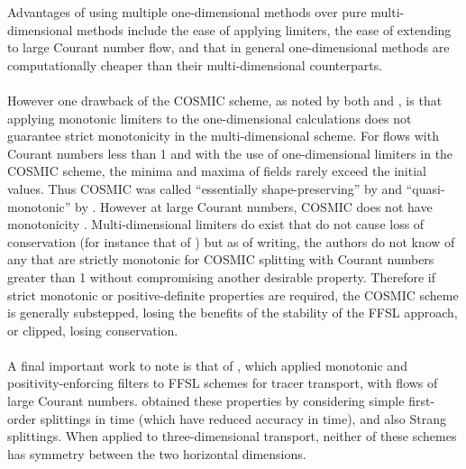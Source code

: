 \documentclass{ametsocV6.1}
\begin{document}
Advantages of using multiple one-dimensional methods over pure multi-dimensional methods include the ease of applying limiters, the ease of extending to large Courant number flow, and that in general one-dimensional methods are computationally cheaper than their multi-dimensional counterparts. \\
\\
However one drawback of the COSMIC scheme, as noted by both \citet{leonard1996cosmic} and \citet{lin1996ffsl},  is that applying monotonic limiters to the one-dimensional calculations does not guarantee strict monotonicity in the multi-dimensional scheme.
For flows with Courant numbers less than 1 and with the use of one-dimensional limiters in the COSMIC scheme, the minima and maxima of fields rarely exceed the initial values.
Thus COSMIC was called ``essentially shape-preserving'' by \citet{leonard1996cosmic} and ``quasi-monotonic'' by \citet{putman2007fvtransport}.
However at large Courant numbers, COSMIC does not have monotonicity \citep{leonard1996cosmic,bott2010improving}.
Multi-dimensional limiters do exist that do not cause loss of conservation (for instance that of \citet{thuburn1996multidimensional}) but as of writing, the authors do not know of any that are strictly monotonic for COSMIC splitting with Courant numbers greater than 1 without compromising another desirable property.
Therefore if strict monotonic or positive-definite properties are required, the COSMIC scheme is generally substepped, losing the benefits of the stability of the FFSL approach, or clipped, losing conservation. \\
\\
A final important work to note is that of \citet{skamarock2006limiters}, which applied monotonic and positivity-enforcing filters to FFSL schemes for tracer transport, with flows of large Courant numbers.
\citet{skamarock2006limiters} obtained these properties by considering simple first-order splittings in time (which have reduced accuracy in time), and also Strang splittings.
When applied to three-dimensional transport, neither of these schemes has symmetry between the two horizontal dimensions.
 
\end{document}
